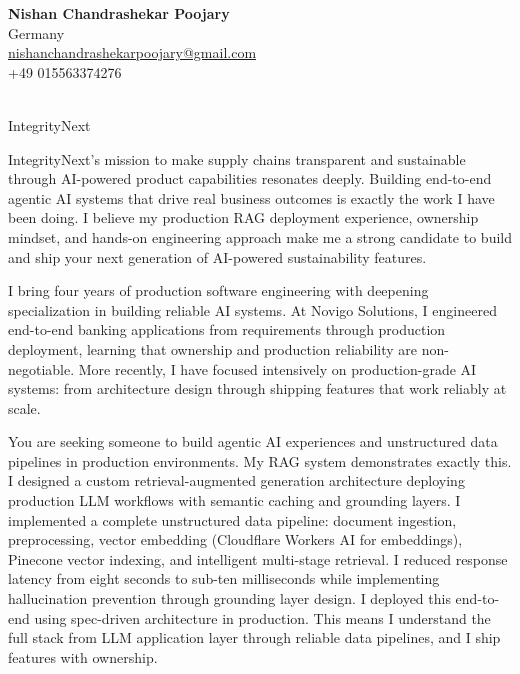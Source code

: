 \documentclass[10pt,a4paper]{article}
\begin{document}
\noindent\textbf{Nishan Chandrashekar Poojary} \\
Germany \\
\href{mailto:nishanchandrashekarpoojary@gmail.com}{nishanchandrashekarpoojary@gmail.com} \\
+49 015563374276

\vspace{0.6cm}

 \\
{IntegrityNext}

\vspace{0.4cm}

\noindent IntegrityNext's mission to make supply chains transparent and sustainable through AI-powered product capabilities resonates deeply. Building end-to-end agentic AI systems that drive real business outcomes is exactly the work I have been doing. I believe my production RAG deployment experience, ownership mindset, and hands-on engineering approach make me a strong candidate to build and ship your next generation of AI-powered sustainability features.

\vspace{0.4cm}

\noindent I bring four years of production software engineering with deepening specialization in building reliable AI systems. At Novigo Solutions, I engineered end-to-end banking applications from requirements through production deployment, learning that ownership and production reliability are non-negotiable. More recently, I have focused intensively on production-grade AI systems: from architecture design through shipping features that work reliably at scale.

\vspace{0.4cm}

\noindent You are seeking someone to build agentic AI experiences and unstructured data pipelines in production environments. My RAG system demonstrates exactly this. I designed a custom retrieval-augmented generation architecture deploying production LLM workflows with semantic caching and grounding layers. I implemented a complete unstructured data pipeline: document ingestion, preprocessing, vector embedding (Cloudflare Workers AI for embeddings), Pinecone vector indexing, and intelligent multi-stage retrieval. I reduced response latency from eight seconds to sub-ten milliseconds while implementing hallucination prevention through grounding layer design. I deployed this end-to-end using spec-driven architecture in production. This means I understand the full stack from LLM application layer through reliable data pipelines, and I ship features with ownership.
\end{document}
